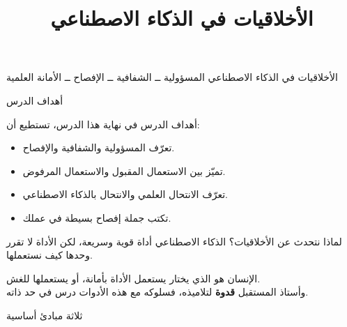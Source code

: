 \documentclass[aspectratio=169, 11pt, xcolor={table}]{beamer}
\title{الأخلاقيات في الذكاء الاصطناعي}
\begin{document}
{الأخلاقيات في الذكاء الاصطناعي}
{المسؤولية ــ الشفافية ــ الإفصاح ــ الأمانة العلمية}

\begin{frame}{أهداف الدرس}
    \begin{tbox}{\faBullseye\quad أهداف الدرس}
        في نهاية هذا الدرس، تستطيع أن:
        \begin{itemize}
            \item تعرّف المسؤولية والشفافية والإفصاح.
            \item تميّز بين الاستعمال المقبول والاستعمال المرفوض.
            \item تعرّف الانتحال العلمي والانتحال بالذكاء الاصطناعي.
            \item تكتب جملة إفصاح بسيطة في عملك.
        \end{itemize}
    \end{tbox}
\end{frame}

\begin{frame}{لماذا نتحدث عن الأخلاقيات؟}
    الذكاء الاصطناعي أداة قوية وسريعة، لكن الأداة لا تقرر وحدها كيف نستعملها.

    \vspace{3mm}
    \begin{tbox}{\faUserCheck\quad الإنسان هو الذي يختار}
        يستعمل الأداة بأمانة، أو يستعملها للغش.\\[3pt]
        وأستاذ المستقبل \textbf{قدوة} لتلاميذه، فسلوكه مع هذه الأدوات درس في حد ذاته.
    \end{tbox}
\end{frame}

\begin{frame}{ثلاثة مبادئ أساسية}
    \begin{center}
    \end{center}
\end{frame}
\end{document}
